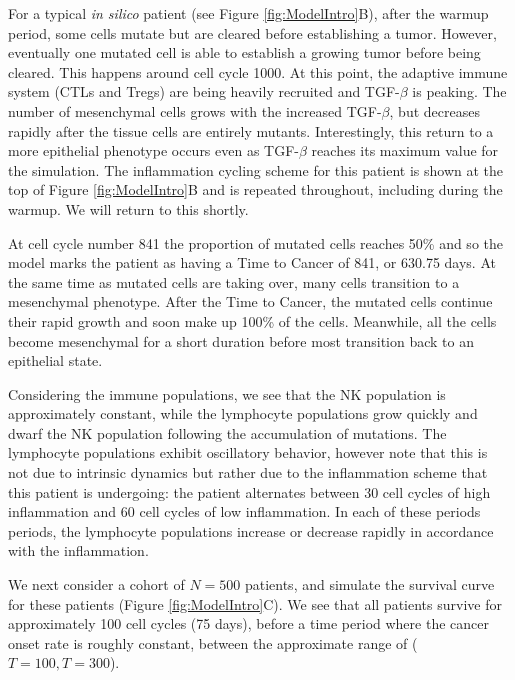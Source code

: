 \documentclass[11pt, preprint]{article}
\newcommand{\tcr} { \textcolor{red} }
\begin{document}
For a typical {\it in silico} patient (see Figure \ref{fig:ModelIntro}B), after the warmup period, some cells mutate but are cleared before establishing a tumor. However, eventually one mutated cell is able to establish a growing tumor before being cleared. This happens around cell cycle 1000. At this point, the adaptive immune system (CTLs and Tregs) are being heavily recruited and TGF-$\beta$ is peaking. The number of mesenchymal cells grows with the increased TGF-$\beta$, but decreases rapidly after the tissue cells are entirely mutants. Interestingly, this return to a more epithelial phenotype occurs even as TGF-$\beta$ reaches its maximum value for the simulation.
The inflammation cycling scheme for this patient is shown at the top of Figure \ref{fig:ModelIntro}B and is repeated throughout, including during the warmup.
We will return to this shortly.

At cell cycle number 841 the proportion of mutated cells reaches 50\% and so the model marks the patient as having a Time to Cancer of 841, or 630.75 days. 
At the same time as mutated cells are taking over, many cells transition to a mesenchymal phenotype.
After the Time to Cancer, the mutated cells continue their rapid growth and soon make up 100\% of the cells.
Meanwhile, all the cells become mesenchymal for a short duration before most transition back to an epithelial state.

Considering the immune populations, we see that the NK population is approximately constant, while the lymphocyte populations grow quickly and dwarf the NK population following the accumulation of mutations.
The lymphocyte populations exhibit oscillatory behavior, however note that this is not due to intrinsic dynamics but rather due to the inflammation scheme that this patient is undergoing: 
the patient alternates between 30 cell cycles of high inflammation and 60 cell cycles of low inflammation.
In each of these periods periods, the lymphocyte populations increase or decrease rapidly in accordance with the inflammation.

We next consider a cohort of $N=500$ patients, and simulate the survival curve for these patients (Figure \ref{fig:ModelIntro}C). We see that all patients survive for approximately 100 cell cycles (75 days), before a time period where the cancer onset rate is roughly constant, between the approximate range of ($T = 100, T = 300$).
\end{document}
